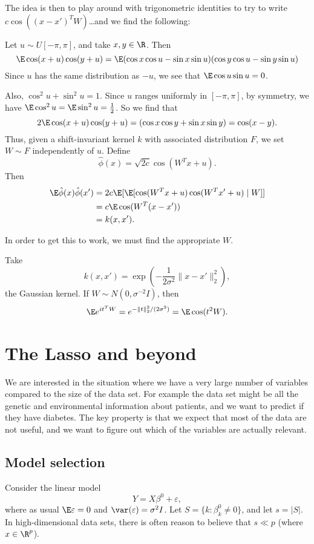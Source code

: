 \documentclass[a4paper]{article}
\begin{document}
The idea is then to play around with trigonometric identities to try to write $c \cos ((x - x')^T W)$\ldots and we find the following:

Let $u \sim U[-\pi, \pi]$, and take $x, y \in \R$. Then
\[
  \E \cos(x + u)\cos (y + u) = \E (\cos x \cos u - \sin x \sin u)(\cos y \cos u - \sin y \sin u)
\]
Since $u$ has the same distribution as $-u$, we see that $\E \cos u\sin u = 0$.

Also, $\cos^2 u + \sin^2 u = 1$. Since $u$ ranges uniformly in $[-\pi, \pi]$, by symmetry, we have $\E \cos^2 u = \E \sin^2 u = \frac{1}{2}$. So we find that
\[
  2 \E \cos(x + u) \cos (y + u) = (\cos x \cos y + \sin x \sin y) = \cos (x - y).
\]
Thus, given a shift-invariant kernel $k$ with associated distribution $F$, we set $W \sim F$ independently of $u$. Define
\[
  \hat{\phi}(x) = \sqrt{2c} \cos (W^T x + u).
\]
Then
\begin{align*}
  \E \hat{\phi}(x) \hat{\phi}(x') &= 2c \E[\E[\cos (W^T x + u) \cos (W^T x' + u) \mid W]]\\
  &= c \E \cos(W^T (x - x'))\\
  &= k(x, x').
\end{align*}

In order to get this to work, we must find the appropriate $W$.
\begin{eg}
  Take
  \[
    k(x, x') = \exp\left(-\frac{1}{2\sigma^2} \|x - x'\|_2^2\right),
  \]
  the Gaussian kernel. If $W \sim N(0, \sigma^{-2} I)$, then
  \[
    \E e^{it^TW} = e^{-\|t\|_2^2/(2\sigma^2)} = \E \cos(t^2 W).
  \]
\end{eg}

\section{The Lasso and beyond}
We are interested in the situation where we have a very large number of variables compared to the size of the data set. For example the data set might be all the genetic and environmental information about patients, and we want to predict if they have diabetes. The key property is that we expect that most of the data are not useful, and we want to figure out which of the variables are actually relevant. %

\subsection{Model selection}
Consider the linear model
\[
  Y = X \beta^0 + \varepsilon,
\]
where as usual $\E \varepsilon = 0$ and $\var(\varepsilon) = \sigma^2 I$. Let $S = \{k : \beta^0_k \not= 0\}$, and let $s = |S|$. In high-dimensional data sets, there is often reason to believe that $s \ll p$ (where $x \in \R^p$).
\end{document}

